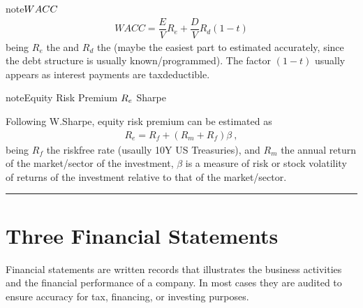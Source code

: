 \documentclass[letterpaper,10pt,english]{jupyterBook}
\begin{document}
\begin{sphinxadmonition}{note}{\protect\(WACC\protect\)}
\begin{equation*}
\begin{split}WACC = \dfrac{E}{V} R_e + \dfrac{D}{V} R_d (1 - t)\end{split}
\end{equation*}
\sphinxAtStartPar
being \(R_e\) the  and \(R_d\) the  (maybe the easiest part to estimated accurately, since the debt structure is usually known/programmed). The factor \((1-t)\) usually appears as interest payments are tax\sphinxhyphen{}deductible.
\end{sphinxadmonition}

\begin{sphinxadmonition}{note}{Equity Risk Premium \protect\(R_e\protect\) \sphinxhyphen{} Sharpe}

\sphinxAtStartPar
Following W.Sharpe, equity risk premium can be estimated as
\begin{equation*}
\begin{split}R_e = R_f + (R_m + R_f) \beta \ ,\end{split}
\end{equation*}
\sphinxAtStartPar
being \(R_f\) the risk\sphinxhyphen{}free rate (usaully 10Y US Treasuries), and \(R_m\) the annual return of the market/sector of the investment, \(\beta\) is a measure of risk or stock volatility of returns of the investment relative to that of the market/sector.
\end{sphinxadmonition}


\bigskip\hrule\bigskip


\sphinxstepscope


\section{Three Financial Statements}
\label{\detokenize{ch/assets/financial-statements:three-financial-statements}}\label{\detokenize{ch/assets/financial-statements:fin-edu-financial-statements}}\label{\detokenize{ch/assets/financial-statements::doc}}
\sphinxAtStartPar
Financial statements are written records that illustrates the business activities and the financial performance of a company. In most cases they are audited to ensure accuracy for tax, financing, or investing purposes.
\end{document}
